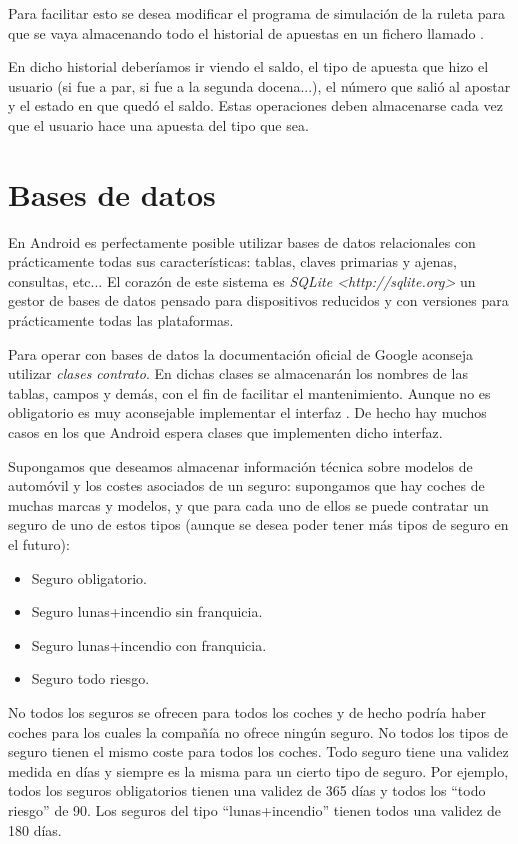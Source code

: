 \documentclass[a4paper,12pt,spanish]{sphinxmanual}
\begin{document}
Para facilitar esto se desea modificar el programa de simulación de la ruleta para que se vaya almacenando todo el historial de apuestas en un fichero llamado .

En dicho historial deberíamos ir viendo el saldo, el tipo de apuesta que hizo el usuario (si fue a par, si fue a la segunda docena...), el número que salió al apostar y el estado en que quedó el saldo. Estas operaciones deben almacenarse cada vez que el usuario hace una apuesta del tipo que sea.


\section{Bases de datos}
\label{tema2:bases-de-datos}
En Android es perfectamente posible utilizar bases de datos relacionales con prácticamente todas sus características: tablas, claves primarias y ajenas, consultas, etc... El corazón de este sistema es \emph{SQLite \textless{}http://sqlite.org\textgreater{}} un gestor de bases de datos pensado para dispositivos reducidos y con versiones para prácticamente todas las plataformas.

Para operar con bases de datos la documentación oficial de Google aconseja utilizar \emph{clases contrato}. En dichas clases se almacenarán los nombres de las tablas, campos y demás, con el fin de facilitar el mantenimiento. Aunque no es obligatorio es muy aconsejable implementar el interfaz . De hecho hay muchos casos en los que Android espera clases que implementen dicho interfaz.

Supongamos que deseamos almacenar información técnica sobre modelos de automóvil y los costes asociados de un seguro: supongamos que hay coches de muchas marcas y modelos, y que para cada uno de ellos se puede contratar un seguro de uno de estos tipos (aunque se desea poder tener más tipos de seguro en el futuro):
\begin{itemize}
\item {} 
Seguro obligatorio.

\item {} 
Seguro lunas+incendio sin franquicia.

\item {} 
Seguro lunas+incendio con franquicia.

\item {} 
Seguro todo riesgo.

\end{itemize}

No todos los seguros se ofrecen para todos los coches y de hecho podría haber coches para los cuales la compañía no ofrece ningún seguro. No todos los tipos de seguro tienen el mismo coste para todos los coches. Todo seguro tiene una validez medida en días y siempre es la misma para un cierto tipo de seguro. Por ejemplo, todos los seguros obligatorios tienen una validez de 365 días y todos los ``todo riesgo'' de 90. Los seguros del tipo ``lunas+incendio'' tienen todos una validez de 180 días.
\end{document}
